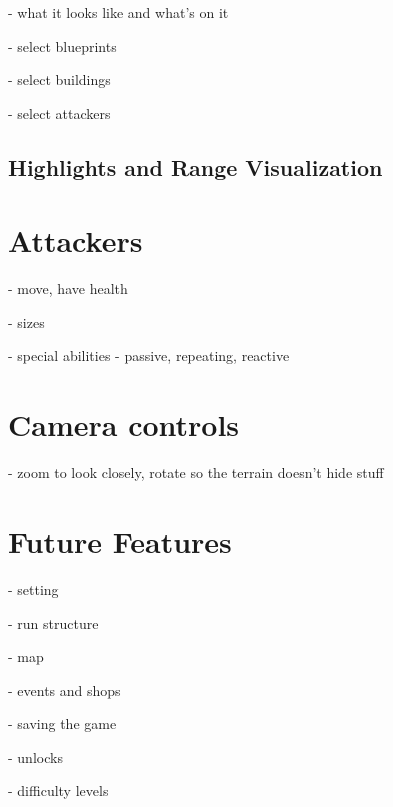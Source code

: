 - what it looks like and what's on it

- select blueprints

- select buildings

- select attackers

\subsection{Highlights and Range Visualization}

\section{Attackers}

- move, have health

- sizes

- special abilities - passive, repeating, reactive

\section{Camera controls}

- zoom to look closely, rotate so the terrain doesn't hide stuff

\section{Future Features}

- setting

- run structure

- map

- events and shops

- saving the game

- unlocks

- difficulty levels

